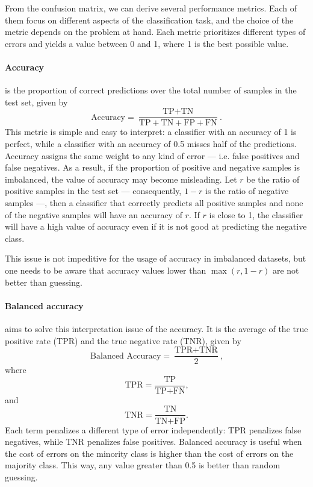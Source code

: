 From the confusion matrix, we can derive several performance metrics.  Each of them focus
on different aspects of the classification task, and the choice of the metric depends on
the problem at hand.  Each metric prioritizes different types of errors and yields
a value between 0 and 1, where 1 is the best possible value.

\paragraph{Accuracy} is the proportion of correct predictions over the total number of
samples in the test set, given by
\begin{equation*}
  \text{Accuracy} = \frac{\text{TP} + \text{TN}}{\text{TP} + \text{TN} + \text{FP} + \text{FN}}\text{.}
\end{equation*}
This metric is simple and easy to interpret: a classifier with an accuracy of 1 is
perfect, while a classifier with an accuracy of 0.5 misses half of the predictions.
Accuracy assigns the same weight to any kind of error --- i.e. false positives and false
negatives.  As a result, if the proportion of positive and negative samples is imbalanced,
the value of accuracy may become misleading.  Let $r$ be the ratio of positive samples in
the test set --- consequently, $1-r$ is the ratio of negative samples ---, then a
classifier that correctly predicts all positive samples and none of the negative samples
will have an accuracy of $r$.  If $r$ is close to 1, the classifier will have a high value
of accuracy even if it is not good at predicting the negative class.

This issue is not impeditive for the usage of accuracy in imbalanced datasets, but one
needs to be aware that accuracy values lower than $\max(r, 1-r)$ are not better than
guessing.

\paragraph{Balanced accuracy} aims to solve this interpretation issue of the accuracy.  It
is the average of the true positive rate (TPR) and the true negative rate (TNR), given by
\begin{equation*}
  \text{Balanced Accuracy} = \frac{\text{TPR} + \text{TNR}}{2}\text{,}
\end{equation*}
where
\[
  \text{TPR} = \frac{\text{TP}}{\text{TP} + \text{FN}}\text{,}
\]
and
\[
  \text{TNR} = \frac{\text{TN}}{\text{TN} + \text{FP}}\text{.}
\]
Each term penalizes a different type of error independently: TPR penalizes false
negatives, while TNR penalizes false positives.  Balanced accuracy is useful when the cost
of errors on the minority class is higher than the cost of errors on the majority class.
This way, any value greater than 0.5 is better than random guessing.

